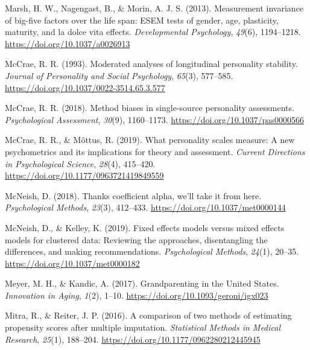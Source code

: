 \documentclass[
  english,
  man, noextraspace]{apa7}
\begin{document}
\leavevmode\hypertarget{ref-marshMeasurementInvarianceBigfive2013}{}%
Marsh, H. W., Nagengast, B., \& Morin, A. J. S. (2013). Measurement invariance of big-five factors over the life span: ESEM tests of gender, age, plasticity, maturity, and la dolce vita effects. \emph{Developmental Psychology}, \emph{49}(6), 1194--1218. \url{https://doi.org/10.1037/a0026913}

\leavevmode\hypertarget{ref-mccraeModeratedAnalysesLongitudinal1993}{}%
McCrae, R. R. (1993). Moderated analyses of longitudinal personality stability. \emph{Journal of Personality and Social Psychology}, \emph{65}(3), 577--585. \url{https://doi.org/10.1037/0022-3514.65.3.577}

\leavevmode\hypertarget{ref-mccraeMethodBiasesSinglesource2018}{}%
McCrae, R. R. (2018). Method biases in single-source personality assessments. \emph{Psychological Assessment}, \emph{30}(9), 1160--1173. \url{https://doi.org/10.1037/pas0000566}

\leavevmode\hypertarget{ref-mccraeWhatPersonalityScales2019}{}%
McCrae, R. R., \& Mõttus, R. (2019). What personality scales measure: A new psychometrics and its implications for theory and assessment. \emph{Current Directions in Psychological Science}, \emph{28}(4), 415--420. \url{https://doi.org/10.1177/0963721419849559}

\leavevmode\hypertarget{ref-mcneishThanksCoefficientAlpha2018}{}%
McNeish, D. (2018). Thanks coefficient alpha, we'll take it from here. \emph{Psychological Methods}, \emph{23}(3), 412--433. \url{https://doi.org/10.1037/met0000144}

\leavevmode\hypertarget{ref-mcneishFixedEffectsModels2019}{}%
McNeish, D., \& Kelley, K. (2019). Fixed effects models versus mixed effects models for clustered data: Reviewing the approaches, disentangling the differences, and making recommendations. \emph{Psychological Methods}, \emph{24}(1), 20--35. \url{https://doi.org/10.1037/met0000182}

\leavevmode\hypertarget{ref-meyerGrandparentingUnitedStates2017}{}%
Meyer, M. H., \& Kandic, A. (2017). Grandparenting in the United States. \emph{Innovation in Aging}, \emph{1}(2), 1--10. \url{https://doi.org/10.1093/geroni/igx023}

\leavevmode\hypertarget{ref-mitraComparisonTwoMethods2016}{}%
Mitra, R., \& Reiter, J. P. (2016). A comparison of two methods of estimating propensity scores after multiple imputation. \emph{Statistical Methods in Medical Research}, \emph{25}(1), 188--204. \url{https://doi.org/10.1177/0962280212445945}
\end{document}
